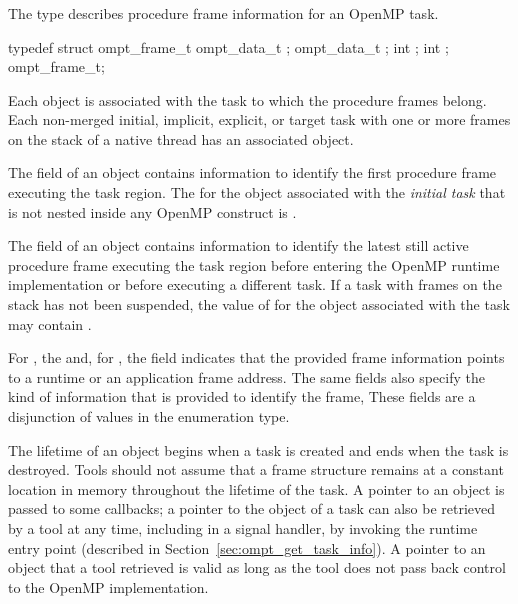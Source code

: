 \subsubsection{}
\label{sec:ompt_frame_t}
\label{subsubsubsec:ompt_frame_t}

\summary
The  type describes procedure frame information 
for an OpenMP task.

\format
\begin{ccppspecific}
\begin{ompSyntax}
typedef struct ompt_frame_t {
  ompt_data_t ;
  ompt_data_t ;
  int ;
  int ;
} ompt_frame_t;
\end{ompSyntax}
\end{ccppspecific}

\descr
Each  object is associated with the task to which 
the procedure frames belong. Each non-merged initial, implicit, explicit, 
or target task with one or more frames on the stack of a native thread 
has an associated  object.

The  field of an  object contains
information to identify the first procedure frame executing the task region.
The  for the  object associated with 
the \emph{initial task} that is not nested inside any OpenMP construct 
is .

The  field of an  object contains
information to identify the latest still active procedure frame 
executing the task region before entering the OpenMP runtime 
implementation or before executing a different task. If a task with 
frames on the stack has not been suspended, the value of  
for the  object associated with the task may 
contain .

For , the  and, for ,
the  field indicates that the provided frame information 
points to a runtime or an application frame address. The same fields also 
specify the kind of information that is provided to identify the frame, These 
fields are a disjunction of values in the  enumeration type.

The lifetime of an  object begins when a task is created
and ends when the task is destroyed. Tools should not assume that
a frame structure remains at a constant location in memory throughout the
lifetime of the task. A pointer to an  object is passed 
to some callbacks; a pointer to the  object of a task
can also be retrieved by a tool at any time, including in a signal
handler, by invoking the  runtime entry point 
(described in Section~\ref{sec:ompt_get_task_info}). A pointer to an 
 object that a tool retrieved is valid as long as 
the tool does not pass back control to the OpenMP implementation.

